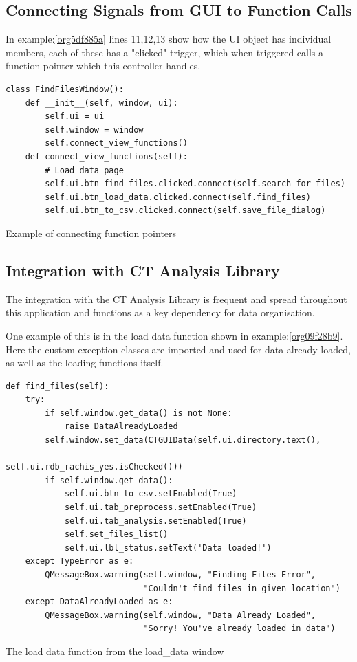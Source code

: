 \documentclass[11pt]{report}
\begin{document}
\subsection{Connecting Signals from GUI to Function Calls}
\label{sec:org0ead8e3}
In example:\ref{org5df885a} lines 11,12,13 show how the UI object has individual members, each of these has a "clicked" trigger, which when triggered calls a function pointer which this controller handles.
\begin{listing}[htbp]
\begin{verbatim}
class FindFilesWindow():
    def __init__(self, window, ui):
        self.ui = ui
        self.window = window
        self.connect_view_functions()
    def connect_view_functions(self):
        # Load data page
        self.ui.btn_find_files.clicked.connect(self.search_for_files)
        self.ui.btn_load_data.clicked.connect(self.find_files)
        self.ui.btn_to_csv.clicked.connect(self.save_file_dialog)
\end{verbatim}
\caption{\label{org5df885a}
Example of connecting function pointers}
\end{listing}

\subsection{Integration with CT Analysis Library}
\label{sec:org4708b08}

The integration with the CT Analysis Library is frequent and spread throughout this application and functions as a key dependency for data organisation.

One example of this is in the load data function shown in example:\ref{org09f28b9}. Here the custom exception classes are imported and used for data already loaded, as well as the loading functions itself.

\begin{listing}[htbp]
\begin{verbatim}
def find_files(self):
    try:
        if self.window.get_data() is not None:
            raise DataAlreadyLoaded
        self.window.set_data(CTGUIData(self.ui.directory.text(),
                                       self.ui.rdb_rachis_yes.isChecked()))
        if self.window.get_data():
            self.ui.btn_to_csv.setEnabled(True)
            self.ui.tab_preprocess.setEnabled(True)
            self.ui.tab_analysis.setEnabled(True)
            self.set_files_list()
            self.ui.lbl_status.setText('Data loaded!')
    except TypeError as e:
        QMessageBox.warning(self.window, "Finding Files Error",
                            "Couldn't find files in given location")
    except DataAlreadyLoaded as e:
        QMessageBox.warning(self.window, "Data Already Loaded",
                            "Sorry! You've already loaded in data")
\end{verbatim}
\caption{\label{org09f28b9}
The load data function from the load\_data window}
\end{listing}
\end{document}

